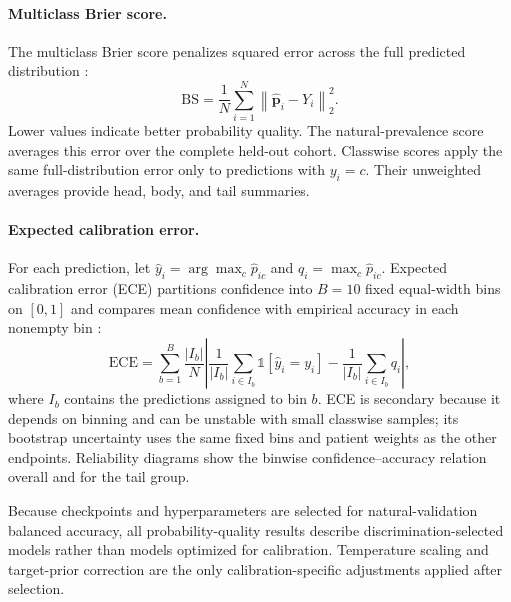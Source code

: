 \documentclass[11pt]{article}
\begin{document}
\paragraph{Multiclass Brier score.}
The multiclass Brier score penalizes squared error across the full predicted distribution \citep{brier1950verification}:
\begin{equation}
  \mathrm{BS}=\frac{1}{N}\sum_{i=1}^{N}
  \left\|\hat{\mathbf{p}}_i-Y_i\right\|_2^2.
  \label{eq:brier}
\end{equation}
\noindent Lower values indicate better probability quality. The natural-prevalence score averages this error over the complete held-out cohort. Classwise scores apply the same full-distribution error only to predictions with $y_i=c$. Their unweighted averages provide head, body, and tail summaries.

\paragraph{Expected calibration error.}
For each prediction, let $\hat{y}_i=\arg\max_c\hat{p}_{ic}$ and $q_i=\max_c\hat{p}_{ic}$. Expected calibration error (ECE) partitions confidence into $B=10$ fixed equal-width bins on $[0,1]$ and compares mean confidence with empirical accuracy in each nonempty bin \citep{naeini2015obtaining}:
\begin{equation}
  \mathrm{ECE}=\sum_{b=1}^{B}\frac{|I_b|}{N}
  \left|\frac{1}{|I_b|}\sum_{i\in I_b}\mathbb{1}[\hat{y}_i=y_i]
  -\frac{1}{|I_b|}\sum_{i\in I_b}q_i\right|,
  \label{eq:ece}
\end{equation}
\noindent where $I_b$ contains the predictions assigned to bin $b$. ECE is secondary because it depends on binning and can be unstable with small classwise samples; its bootstrap uncertainty uses the same fixed bins and patient weights as the other endpoints. Reliability diagrams show the binwise confidence--accuracy relation overall and for the tail group.

Because checkpoints and hyperparameters are selected for natural-validation balanced accuracy, all probability-quality results describe discrimination-selected models rather than models optimized for calibration. Temperature scaling and target-prior correction are the only calibration-specific adjustments applied after selection.
\end{document}
